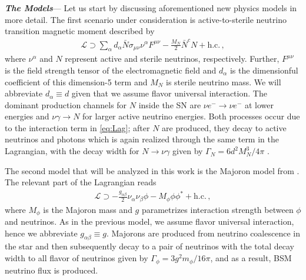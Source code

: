 \textbf{\textit{The Models}}---
Let us start by discussing aforementioned new physics models in more detail.
The first scenario under consideration is active-to-sterile neutrino transition magnetic moment described by \cite{Magill:2018jla,Brdar:2020quo,Brdar:2023tmi}
\begin{align}
    \mathcal{L} \supset \sum_\alpha d_\alpha \bar{N}\sigma_{\mu\nu} \nu^{\alpha} F^{\mu\nu}-\frac{M_N}{2} \bar{N}^c N + \text{h.c.}\,,
    \label{eq:Lag}
\end{align}
where $\nu^{\alpha}$ and $N$ represent active and sterile neutrinos, respectively. Further, $F^{\mu\nu}$ is the field strength tensor of the electromagnetic field and $d_\alpha$ is the dimensionful coefficient of this dimension-5 term and $M_N$ is sterile neutrino mass. We will abbreviate $d_\alpha \equiv d$ given that we assume flavor universal interaction. The dominant production channels for $N$ inside the SN are $\nu e^- \to \nu e^-$ at lower energies and $\nu \gamma \to N$ for larger active neutrino energies. Both processes occur due to the interaction term in \cref{eq:Lag}; after $N$ are produced, they decay to active neutrinos and photons which is again realized through the same term in the Lagrangian, with the decay width for $N\to\nu\gamma$ given by $\Gamma_N = 6d^2 M_N^3/4 \pi$ \cite{Plestid:2020vqf}. 

The second model that will be analyzed in this work is the Majoron model from \cite{Fiorillo:2022cdq}. The relevant part of the Lagrangian reads
\begin{align}
\mathcal{L} \supset -\frac{g_{\alpha\beta}}{2} \nu_\alpha \nu_\beta \phi - M_\phi \phi\phi^* + \text{h.c.}\,,
\end{align}
where $M_\phi$ is the Majoron mass and $g$ parametrizes interaction strength between $\phi$ and neutrinos. As in the previous model, we assume flavor universal interaction, hence we abbreviate $g_{\alpha\beta}\equiv g$. Majorons are produced from neutrino coalescence in the star and then subsequently decay to a pair of neutrinos with the total decay width to all flavor of neutrinos given by $\Gamma_\phi = 3g^2 m_\phi/16 \pi$, and as a result, BSM neutrino flux is produced. 


